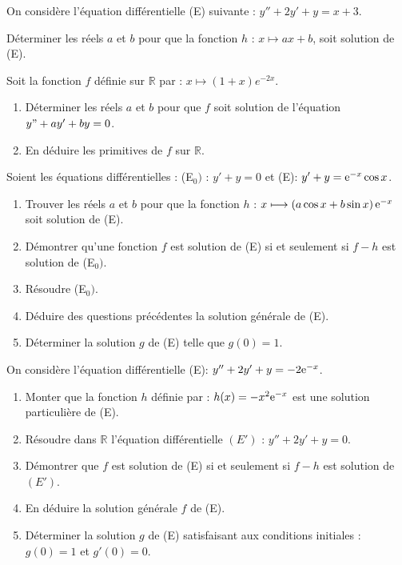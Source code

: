  \begin{exercice} 
  On considère l'équation différentielle (E) suivante :\;  $y''+2y'+y=x+3$.


 Déterminer les réels $ a$ et $b $  pour  que la fonction $ h $ : $ x\longmapsto ax+b $, soit solution de (E).
 
\end{exercice}
  \begin{exercice} 
  Soit  la fonction $ f $ définie sur $ \mathbb{R} $ par  : $ x\longmapsto (1 + x)e ^{-2x}$.
\begin{enumerate}
\item  Déterminer les  réels $ a $ et $ b $ pour
que $ f $ soit solution de l'équation $ y" + ay' + by = 0$.
\item En déduire  les primitives de $ f $  sur $ \mathbb{R} $.
\end{enumerate}
 
\end{exercice}
  \begin{exercice} 
   Soient les équations différentielles : \;  (E$_{0})$ : \;$  y'+y=0 $\; et \; (E): \;$  y'+y=\mathrm{e}^{-x}\cos x $.
 \begin{enumerate}
\item  Trouver les réels $ a$ et $b $ pour que la fonction  $ h $ :  $ x\longmapsto\left(a\cos x+b\sin x\right)\mathrm{e}^{-x} $  soit solution de (E).
\item Démontrer  qu'une fonction $f$ est solution de (E) si et seulement si $ f-h$  est solution de (E$_{0})$.
\item Résoudre (E$_{0})$.
\item Déduire des questions précédentes la solution générale de (E).
\item Déterminer la solution   $ g $ de (E)  telle que $ g(0)=1 $.
\end{enumerate}

\end{exercice}
  \begin{exercice} 
  On considère l'équation différentielle (E):\; $ y''+2y'+y=-2\mathrm{e}^{-x} $. 
\begin{enumerate}
\item Monter  que la fonction $ h$ définie par : $ h(x)=-x^{2}\mathrm{e}^{-x} $   est une solution particulière de (E).
\item  Résoudre dans $ \mathbb{R}$ l'équation différentielle $ (E') $ \;: $  y''+2y'+y=0 $.
\item Démontrer  que   $ f $  est solution de  (E)   si et seulement si  $ f-h $  est solution de  $ (E') $.
\item En déduire la solution générale  $ f $ de (E).
\item Déterminer la solution $ g $  de (E) satisfaisant aux conditions initiales \;: $g(0)=1 $ et $ g'(0)=0$.
\end{enumerate}

\end{exercice}
